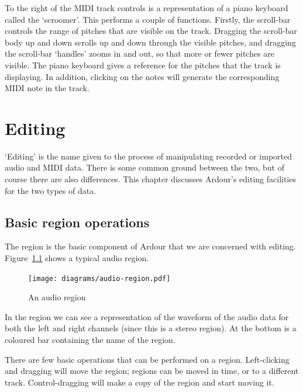 \documentclass[10pt,a4paper]{book}
\newcommand{\todo}[1]{\marginpar{\small\texttt{#1}}}
\newcommand{\modone}{Control}
\begin{document}
{\todo{What does Force do}

To the right of the MIDI track controls is a representation of a piano
keyboard called the `scroomer'.  This performs a couple of functions.
Firstly, the scroll-bar controls the range of pitches that are visible
on the track.  Dragging the scroll-bar body up and down scrolls up and
down through the visible pitches, and dragging the scroll-bar
`handles' zooms in and out, so that more or fewer pitches are visible.
The piano keyboard gives a reference for the pitches that the track is
displaying.  In addition, clicking on the notes will generate the
corresponding MIDI note in the track.




\chapter{Editing}

`Editing' is the name given to the process of manipulating recorded or
imported audio and MIDI data.  There is some common ground between the
two, but of course there are also differences.  This chapter discusses
Ardour's editing facilities for the two types of data.


\section{Basic region operations}

The region is the basic component of Ardour that we are concerned with
editing.  Figure~\ref{fig:audio-region} shows a typical audio region.

\begin{figure}[ht]
\begin{center}
\texttt{[image: diagrams/audio-region.pdf]}
\end{center}
\caption{An audio region}
\label{fig:audio-region}
\end{figure}

In the region we can see a representation of the waveform of the audio
data for both the left and right channels (since this is a stereo
region).  At the bottom is a coloured bar containing the name of the
region.

There are few basic operations that can be performed on a region.
Left-clicking and dragging will move the region; regions can be moved
in time, or to a different track.  \modone{}-dragging will make a copy
of the region and start moving it.  

}
\end{document}
